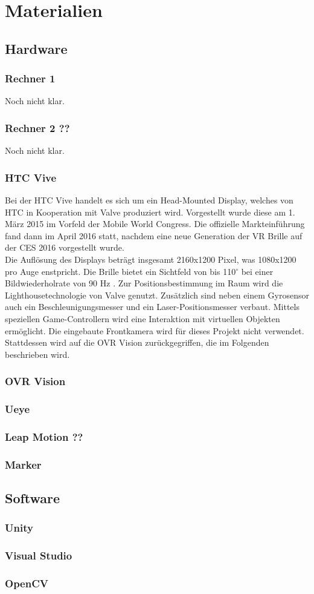 \section{Materialien}
\subsection{Hardware}
\subsubsection{Rechner 1}
Noch nicht klar.
\subsubsection{Rechner 2 ??}
Noch nicht klar.
\subsubsection{HTC Vive}
Bei der HTC Vive handelt es sich um ein Head-Mounted Display, welches von HTC in Kooperation mit Valve \cite{website:Valve} produziert wird. Vorgestellt wurde diese am 1. März 2015 im Vorfeld der Mobile World Congress. Die offizielle Markteinführung fand dann im April 2016 statt, nachdem eine neue Generation der VR Brille auf der CES 2016 vorgestellt wurde. \\
Die Auflösung des Displays beträgt insgesamt 2160x1200 Pixel, was 1080x1200 pro Auge enstpricht. Die Brille bietet ein Sichtfeld von bis 110$^\circ$ bei einer Bildwiederholrate von 90 Hz \cite{website:HTC_Vive}. Zur Positionsbestimmung im Raum wird die  Lighthousetechnologie von Valve genutzt. Zusätzlich sind neben einem Gyrosensor auch ein Beschleunigungsmesser   und ein Laser-Positionsmesser verbaut. Mittels speziellen Game-Controllern wird eine Interaktion mit virtuellen Objekten ermöglicht. Die eingebaute Frontkamera wird für dieses Projekt nicht verwendet. Stattdessen wird auf die OVR Vision zurückgegriffen, die im Folgenden beschrieben wird.
\subsubsection{OVR Vision}
\subsubsection{Ueye}
\subsubsection{Leap Motion ??}
\subsubsection{Marker}
\subsection{Software}
\subsubsection{Unity}
\subsubsection{Visual Studio}
\subsubsection{OpenCV}


\newpage